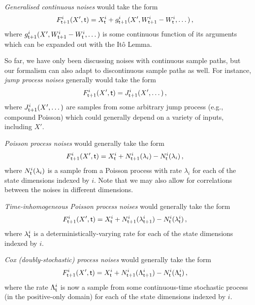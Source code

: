 \documentclass{book}
\begin{document}
\emph{Generalised continuous noises} would take the form
\begin{align}
& F^{i}_{{\sf t}+1}(X',{\sf t}) = X^i_{\sf t} + g^i_{{\sf t}+1}(X', W^i_{{\sf t}+1}-W^i_{\sf t}, \dots) \,,
\end{align}
where $g^i_{{\sf t}+1}(X', W^i_{{\sf t}+1}-W^i_{\sf t}, \dots)$ is some continuous function of its arguments which can be expanded out with the Itô Lemma.

So far, we have only been discussing noises with continuous sample paths, but our formalism can also adapt to discontinuous sample paths as well. For instance, \emph{jump process noises} generally would take the form
\begin{align}
& F^{i}_{{\sf t}+1}(X',{\sf t})= J^i_{{\sf t}+1}(X', \dots )\,,
\end{align}
where $J^i_{{\sf t}+1}(X', \dots )$ are samples from some arbitrary jump process (e.g., compound Poisson) which could generally depend on a variety of inputs, including $X'$. 

\emph{Poisson process noises} would generally take the form
\begin{align}
& F^{i}_{{\sf t}+1}(X',{\sf t}) = X^i_{\sf t} + N^i_{{\sf t}+1}({\lambda_i})-N^i_{\sf t}({\lambda_i})\,,
\end{align}
where $N^i_{\sf t}({\lambda_i})$ is a sample from a Poisson process with rate $\lambda_i$ for each of the state dimensions indexed by $i$. Note that we may also allow for correlations between the noises in different dimensions.

\emph{Time-inhomogeneous Poisson process noises} would generally take the form
\begin{align}
& F^{i}_{{\sf t}+1}(X',{\sf t}) = X^i_{\sf t} + N^i_{{\sf t}+1}({\lambda^i_{{\sf t}+1}})-N^i_{\sf t}({\lambda^i_{\sf t}}) \,,
\end{align}
where $\lambda^i_{\sf t}$ is a deterministically-varying rate for each of the state dimensions indexed by $i$.

\emph{Cox (doubly-stochastic) process noises} would generally take the form
\begin{align}
& F^{i}_{{\sf t}+1}(X',{\sf t}) = X^i_{\sf t} + N^i_{{\sf t}+1}({\Lambda^i_{{\sf t}+1}})-N^i_{\sf t}({\Lambda^i_{\sf t}}) \,,
\end{align}
where the rate $\Lambda^i_{\sf t}$ is now a sample from some continuous-time stochastic process (in the positive-only domain) for each of the state dimensions indexed by $i$.
\end{document}
